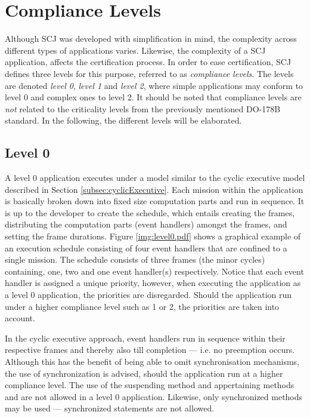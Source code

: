 \section{Compliance Levels}
\label{section:complianceLevels}
Although SCJ was developed with simplification in mind, the complexity across different types of applications varies. Likewise, the complexity of a SCJ application, affects the certification process. In order to ease certification, SCJ defines three levels for this purpose, referred to as \textit{compliance levels}. The levels are denoted \textit{level 0}, \textit{level 1} and \textit{level 2}, where simple applications may conform to level 0 and complex ones to level 2. It should be noted that compliance levels are \textit{not} related to the criticality levels from the previously mentioned DO-178B standard. In the following, the different levels will be elaborated.

\subsection{Level 0}
A level 0 application executes under a model similar to the cyclic executive model described in Section \ref{subsec:cyclicExecutive}. Each mission within the application is basically broken down into fixed size computation parts and run in sequence. It is up to the developer to create the schedule, which entails creating the frames, distributing the computation parts (event handlers) amongst the frames, and setting the frame durations. Figure \ref{img:level0.pdf} shows a graphical example of an execution schedule consisting of four event handlers that are confined to a single mission. The schedule consists of three frames (the minor cycles) containing, one, two and one event handler(s) respectively. Notice that each event handler is assigned a unique priority, however, when executing the application as a level 0 application, the priorities are disregarded. Should the application run under a higher compliance level such as 1 or 2, the priorities are taken into account.


In the cyclic executive approach, event handlers run in sequence within their respective frames and thereby also till completion --- i.e. no preemption occurs. Although this has the benefit of being able to omit synchronisation mechanisms, the use of synchronization is advised, should the application run at a higher compliance level. The use of the suspending method  and appertaining methods  and  are not allowed in a level 0 application. Likewise, only synchronized methods may be used --- synchronized statements are not allowed.

